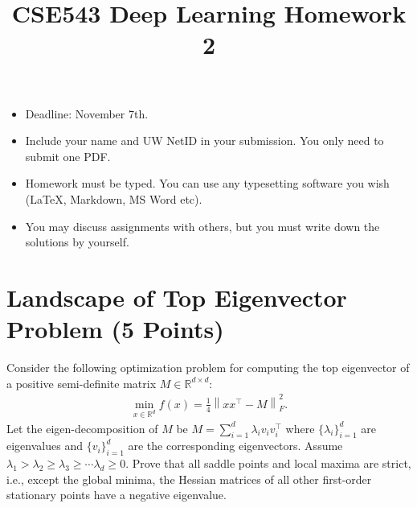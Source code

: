 \documentclass[11pt]{article}
\title{\textbf{CSE543 Deep Learning Homework 2}
}
\newcommand{\norm}[1]{\left\|#1\right\|}
\begin{document}
	
	\maketitle
	
\begin{itemize}
	\item Deadline: November 7th. 
	\item Include your name and UW NetID in your submission. You only need to submit one PDF.
	\item Homework must be typed. You can use any typesetting software you wish (\LaTeX, Markdown, MS Word etc). 
	\item You may discuss assignments with others, but you must write down the solutions by yourself.
\end{itemize}

	
\section{Landscape of Top Eigenvector Problem (5 Points)}
Consider the following optimization problem for computing the top eigenvector of a positive semi-definite matrix $M \in \mathbb{R}^{d \times d}$:\begin{align*}
\min_{x \in \mathbb{R}^d} f(x) = \frac{1}{4} \norm{xx^\top - M}_F^2.
\end{align*}
Let the eigen-decomposition of $M$ be $M = \sum_{i=1}^{d} \lambda_i v_iv_i^\top$ where $\{\lambda_i\}_{i=1}^d$ are eigenvalues and $\{v_i\}_{i=1}^d$ are the corresponding eigenvectors.
Assume $\lambda_1 > \lambda_2 \ge \lambda_3 \ge \cdots \lambda_d \ge 0$.
Prove that all saddle points and local maxima are strict, i.e., except the global minima, the Hessian matrices of all other first-order stationary points have a negative eigenvalue.
\end{document}
